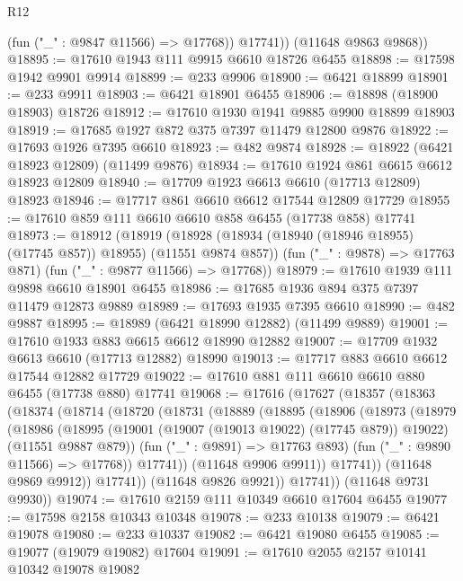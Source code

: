 \begin{lexlean}{R12}
\begin{coremodule}
{{{{{{{{{{{{{{{{{{{{{{{{{{{{{{{{{{{{{{{{{{{{{{{{{{{{{{{{{{{{{{{{{{{{{{{{{{{{{{{{{{            (fun ("_" : @9847 @11566) => @17768))
          @17741))
      (@11648 @9863 @9868))
@18895 := @17610 @1943 @111 @9915 @6610 @18726 @6455
@18898 := @17598 @1942 @9901 @9914
@18899 := @233 @9906
@18900 := @6421 @18899
@18901 := @233 @9911
@18903 := @6421 @18901 @6455
@18906 := @18898 (@18900 @18903) @18726
@18912 := @17610 @1930 @1941 @9885 @9900 @18899 @18903
@18919 := @17685 @1927 @872 @375 @7397 @11479 @12800 @9876
@18922 := @17693 @1926 @7395 @6610
@18923 := @482 @9874
@18928 := @18922 (@6421 @18923 @12809) (@11499 @9876)
@18934 := @17610 @1924 @861 @6615 @6612 @18923 @12809
@18940 := @17709 @1923 @6613 @6610 (@17713 @12809) @18923
@18946 := @17717 @861 @6610 @6612 @17544 @12809 @17729
@18955 := @17610 @859 @111 @6610 @6610 @858 @6455 (@17738 @858) @17741
@18973 := @18912
    (@18919
      (@18928 (@18934 (@18940 (@18946 @18955) (@17745 @857)) @18955) (@11551 @9874 @857))
      (fun ("_" : @9878) => @17763 @871)
      (fun ("_" : @9877 @11566) => @17768))
@18979 := @17610 @1939 @111 @9898 @6610 @18901 @6455
@18986 := @17685 @1936 @894 @375 @7397 @11479 @12873 @9889
@18989 := @17693 @1935 @7395 @6610
@18990 := @482 @9887
@18995 := @18989 (@6421 @18990 @12882) (@11499 @9889)
@19001 := @17610 @1933 @883 @6615 @6612 @18990 @12882
@19007 := @17709 @1932 @6613 @6610 (@17713 @12882) @18990
@19013 := @17717 @883 @6610 @6612 @17544 @12882 @17729
@19022 := @17610 @881 @111 @6610 @6610 @880 @6455 (@17738 @880) @17741
@19068 := @17616
    (@17627
      (@18357
        (@18363
          (@18374
            (@18714
              (@18720
                (@18731
                  (@18889
                    (@18895
                      (@18906
                        (@18973
                          (@18979
                            (@18986
                              (@18995
                                (@19001 (@19007 (@19013 @19022) (@17745 @879)) @19022)
                                (@11551 @9887 @879))
                              (fun ("_" : @9891) => @17763 @893)
                              (fun ("_" : @9890 @11566) => @17768))
                            @17741))
                        (@11648 @9906 @9911))
                      @17741))
                  (@11648 @9869 @9912))
                @17741))
            (@11648 @9826 @9921))
          @17741))
      (@11648 @9731 @9930))
@19074 := @17610 @2159 @111 @10349 @6610 @17604 @6455
@19077 := @17598 @2158 @10343 @10348
@19078 := @233 @10138
@19079 := @6421 @19078
@19080 := @233 @10337
@19082 := @6421 @19080 @6455
@19085 := @19077 (@19079 @19082) @17604
@19091 := @17610 @2055 @2157 @10141 @10342 @19078 @19082
}}}}}}}}}}}}}}}}}}}}}}}}}}}}}}}}}}}}}}}}}}}}}}}}}}}}}}}}}}}}}}}}}}}}}}}}}}}}}}}}}}
\end{coremodule}
\end{lexlean}
